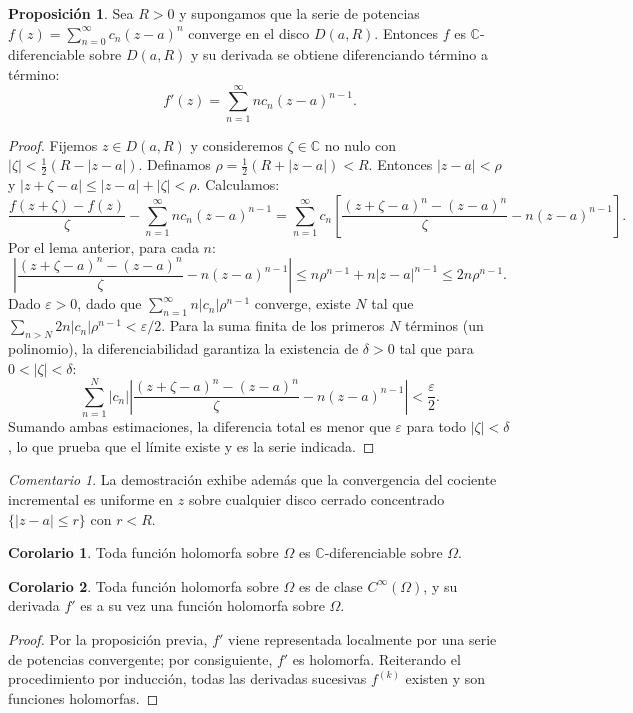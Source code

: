 \documentclass[11pt,a4paper]{article}
\theoremstyle{definition}
\newtheorem{proposicion}{Proposición}[section]
\newtheorem{corolario}{Corolario}[section]
\theoremstyle{remark}
\newtheorem{observacion}{Comentario}[section]
\numberwithin{equation}{section}
\begin{document}
\begin{proposicion}
Sea $R > 0$ y supongamos que la serie de potencias $f(z) = \sum_{n=0}^\infty c_n (z-a)^n$ converge en el disco $D(a,R)$. Entonces $f$ es $\mathbb{C}$-diferenciable sobre $D(a,R)$ y su derivada se obtiene diferenciando término a término:
\begin{equation}
f'(z) = \sum_{n=1}^\infty n c_n (z-a)^{n-1}.
\end{equation}
\end{proposicion}
\begin{proof}
Fijemos $z \in D(a,R)$ y consideremos $\zeta \in \mathbb{C}$ no nulo con $|\zeta| < \frac{1}{2}(R - |z-a|)$. Definamos $\rho = \frac{1}{2}(R + |z-a|) < R$. Entonces $|z-a| < \rho$ y $|z+\zeta-a| \le |z-a|+|\zeta| < \rho$.
Calculamos:
\[
\frac{f(z+\zeta) - f(z)}{\zeta} - \sum_{n=1}^\infty n c_n (z-a)^{n-1} = \sum_{n=1}^\infty c_n \left[ \frac{(z+\zeta-a)^n - (z-a)^n}{\zeta} - n(z-a)^{n-1} \right].
\]
Por el lema anterior, para cada $n$:
\[
\left| \frac{(z+\zeta-a)^n - (z-a)^n}{\zeta} - n(z-a)^{n-1} \right| \le n \rho^{n-1} + n |z-a|^{n-1} \le 2n \rho^{n-1}.
\]
Dado $\varepsilon > 0$, dado que $\sum_{n=1}^\infty n |c_n| \rho^{n-1}$ converge, existe $N$ tal que $\sum_{n > N} 2n |c_n| \rho^{n-1} < \varepsilon/2$. Para la suma finita de los primeros $N$ términos (un polinomio), la diferenciabilidad garantiza la existencia de $\delta > 0$ tal que para $0 < |\zeta| < \delta$:
\[
\sum_{n=1}^N |c_n| \left| \frac{(z+\zeta-a)^n - (z-a)^n}{\zeta} - n(z-a)^{n-1} \right| < \frac{\varepsilon}{2}.
\]
Sumando ambas estimaciones, la diferencia total es menor que $\varepsilon$ para todo $|\zeta| < \delta$, lo que prueba que el límite existe y es la serie indicada.
\end{proof}

\begin{observacion}
La demostración exhibe además que la convergencia del cociente incremental es uniforme en $z$ sobre cualquier disco cerrado concentrado $\{|z-a| \le r\}$ con $r < R$.
\end{observacion}

\begin{corolario}
Toda función holomorfa sobre $\Omega$ es $\mathbb{C}$-diferenciable sobre $\Omega$.
\end{corolario}

\begin{corolario}
Toda función holomorfa sobre $\Omega$ es de clase $C^\infty(\Omega)$, y su derivada $f'$ es a su vez una función holomorfa sobre $\Omega$.
\end{corolario}
\begin{proof}
Por la proposición previa, $f'$ viene representada localmente por una serie de potencias convergente; por consiguiente, $f'$ es holomorfa. Reiterando el procedimiento por inducción, todas las derivadas sucesivas $f^{(k)}$ existen y son funciones holomorfas.
\end{proof}
\end{document}

